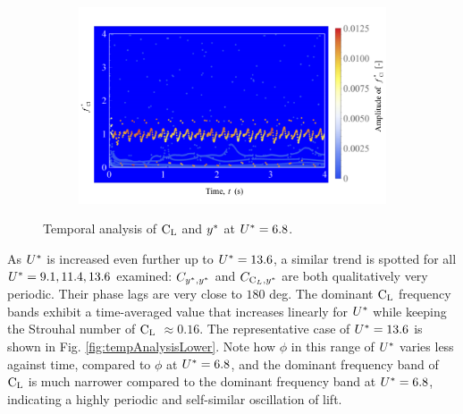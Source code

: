 \documentclass[oneside]{utmthesis}
\begin{document}
\begin{figure} \continuedfloat
  \centering
  \begin{subfigure}[h]{1\textwidth}
    \includegraphics[width=\textwidth]{figs/tempAnalysisUpper-c}
    \caption{}
    \label{fig:tempAnalysisUpper-c}
  \end{subfigure}
  \caption{Temporal analysis of $\text{C}_{\text{L}}$ and $y^{*}$ at $U^{*} = 6.8$.} \label{fig:tempAnalysisUpper}
\end{figure}

As $U^{*}$ is increased even further up to $U^{*} = 13.6$, a similar trend is spotted for all $U^{*} = 9.1, 11.4, 13.6$ examined: $C_{y^{*},y^{*}}$ and $C_{\text{C}_{L},y^{*}}$ are both qualitatively very periodic. Their phase lags are very close to $180$ deg. The dominant $\text{C}_{\text{L}}$ frequency bands exhibit a time-averaged value that increases linearly for $U^{*}$ while keeping the Strouhal number of $\text{C}_{\text{L}}$ $\approx 0.16$. The representative case of $U^{*} = 13.6$ is shown in Fig. \ref{fig:tempAnalysisLower}. Note how $\phi$ in this range of $U^{*}$ varies less against time, compared to $\phi$ at $U^{*} = 6.8$, and the dominant frequency band of $\text{C}_{\text{L}}$ is much narrower compared to the dominant frequency band at $U^{*} = 6.8$, indicating a highly periodic and self-similar oscillation of lift.
\end{document}
